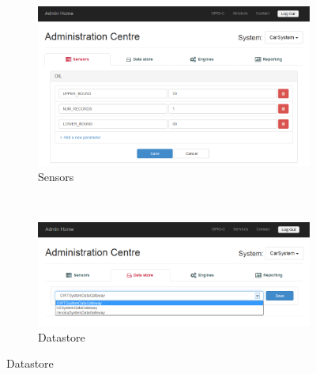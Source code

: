 \documentclass[10pt,a4paper]{article}
\begin{document}
\begin{figure}[h!b]
    \begin{subfigure}{0.49\textwidth}
        \includegraphics[width=\textwidth]{images/admin-centre_sensors.png}
        \caption{Sensors}
        \label{fig:admin-centre_sensors}
    \end{subfigure}
    ~
    \begin{subfigure}{0.49\textwidth}
        \includegraphics[width=\textwidth]{images/admin-centre_data.png}
        \vspace*{1.18cm}
        \caption{Datastore}
        \label{fig:admin-centre_data}
    \end{subfigure}
	\vspace{0.3cm}


\end{figure}
\end{document}
